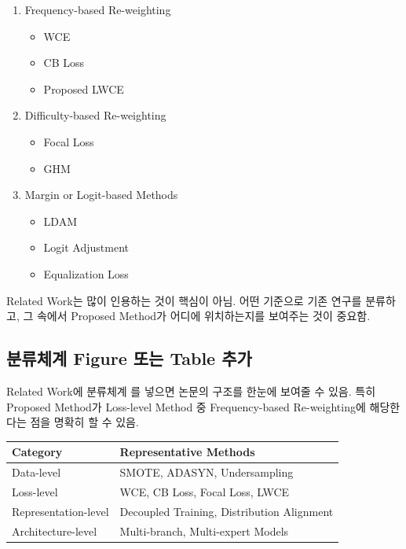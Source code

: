 \documentclass[11pt,a4paper]{article}
\begin{document}
\begin{enumerate}
\item Frequency-based Re-weighting
\begin{itemize}
\item WCE
\item CB Loss
\item Proposed LWCE
\end{itemize}
\item Difficulty-based Re-weighting
\begin{itemize}
\item Focal Loss
\item GHM
\end{itemize}
\item Margin or Logit-based Methods
\begin{itemize}
\item LDAM
\item Logit Adjustment
\item Equalization Loss
\end{itemize}
\end{enumerate}

\begin{tcolorbox}[title= 강조할 점]
Related Work는 많이 인용하는 것이 핵심이 아님. 어떤 기준으로 기존 연구를 분류하고, 그 속에서 Proposed Method가 어디에 위치하는지를 보여주는 것이 중요함.
\end{tcolorbox}

\subsection{분류체계 Figure 또는 Table 추가}

Related Work에 분류체계 를 넣으면 논문의 구조를 한눈에 보여줄 수 있음. 특히 Proposed Method가 Loss-level Method 중 Frequency-based Re-weighting에 해당한다는 점을 명확히 할 수 있음.

\begin{center}
\begin{tabular}{ll}
\toprule
Category & Representative Methods \\
\midrule
Data-level & SMOTE, ADASYN, Undersampling \\
Loss-level & WCE, CB Loss, Focal Loss, LWCE \\
Representation-level & Decoupled Training, Distribution Alignment \\
Architecture-level & Multi-branch, Multi-expert Models \\
\bottomrule
\end{tabular}
\end{center}
\end{document}
